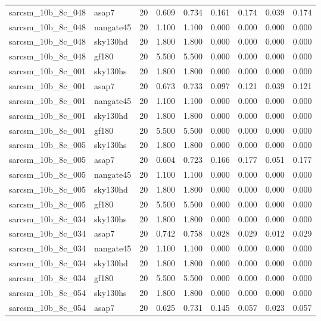 \begin{tabular}{llrrrrrrr}
sarcsm\_10b\_8c\_048 & asap7 & 20 & 0.609 & 0.734 & 0.161 & 0.174 & 0.039 & 0.174 \\
sarcsm\_10b\_8c\_048 & nangate45 & 20 & 1.100 & 1.100 & 0.000 & 0.000 & 0.000 & 0.000 \\
sarcsm\_10b\_8c\_048 & sky130hd & 20 & 1.800 & 1.800 & 0.000 & 0.000 & 0.000 & 0.000 \\
sarcsm\_10b\_8c\_048 & gf180 & 20 & 5.500 & 5.500 & 0.000 & 0.000 & 0.000 & 0.000 \\
sarcsm\_10b\_8c\_001 & sky130hs & 20 & 1.800 & 1.800 & 0.000 & 0.000 & 0.000 & 0.000 \\
sarcsm\_10b\_8c\_001 & asap7 & 20 & 0.673 & 0.733 & 0.097 & 0.121 & 0.039 & 0.121 \\
sarcsm\_10b\_8c\_001 & nangate45 & 20 & 1.100 & 1.100 & 0.000 & 0.000 & 0.000 & 0.000 \\
sarcsm\_10b\_8c\_001 & sky130hd & 20 & 1.800 & 1.800 & 0.000 & 0.000 & 0.000 & 0.000 \\
sarcsm\_10b\_8c\_001 & gf180 & 20 & 5.500 & 5.500 & 0.000 & 0.000 & 0.000 & 0.000 \\
sarcsm\_10b\_8c\_005 & sky130hs & 20 & 1.800 & 1.800 & 0.000 & 0.000 & 0.000 & 0.000 \\
sarcsm\_10b\_8c\_005 & asap7 & 20 & 0.604 & 0.723 & 0.166 & 0.177 & 0.051 & 0.177 \\
sarcsm\_10b\_8c\_005 & nangate45 & 20 & 1.100 & 1.100 & 0.000 & 0.000 & 0.000 & 0.000 \\
sarcsm\_10b\_8c\_005 & sky130hd & 20 & 1.800 & 1.800 & 0.000 & 0.000 & 0.000 & 0.000 \\
sarcsm\_10b\_8c\_005 & gf180 & 20 & 5.500 & 5.500 & 0.000 & 0.000 & 0.000 & 0.000 \\
sarcsm\_10b\_8c\_034 & sky130hs & 20 & 1.800 & 1.800 & 0.000 & 0.000 & 0.000 & 0.000 \\
sarcsm\_10b\_8c\_034 & asap7 & 20 & 0.742 & 0.758 & 0.028 & 0.029 & 0.012 & 0.029 \\
sarcsm\_10b\_8c\_034 & nangate45 & 20 & 1.100 & 1.100 & 0.000 & 0.000 & 0.000 & 0.000 \\
sarcsm\_10b\_8c\_034 & sky130hd & 20 & 1.800 & 1.800 & 0.000 & 0.000 & 0.000 & 0.000 \\
sarcsm\_10b\_8c\_034 & gf180 & 20 & 5.500 & 5.500 & 0.000 & 0.000 & 0.000 & 0.000 \\
sarcsm\_10b\_8c\_054 & sky130hs & 20 & 1.800 & 1.800 & 0.000 & 0.000 & 0.000 & 0.000 \\
sarcsm\_10b\_8c\_054 & asap7 & 20 & 0.625 & 0.731 & 0.145 & 0.057 & 0.023 & 0.057 \\

\end{tabular}
